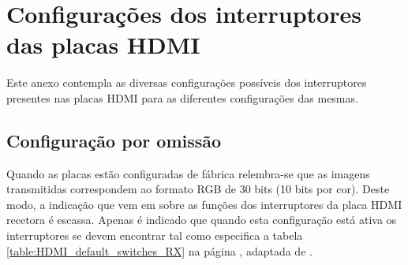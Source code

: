 {\tiny \chapter{Configurações dos interruptores das placas HDMI} \label{ap4:switches}}

Este anexo contempla as diversas configurações possíveis dos interruptores presentes nas placas HDMI para as diferentes configurações das mesmas.

\section{Configuração por omissão} \label{sec:HDMIconfigdefault_switches}

Quando as placas estão configuradas de fábrica relembra-se que as imagens transmitidas correspondem ao formato RGB de 30 bits (10 bits por cor). Deste modo, a indicação que vem em \cite{R009} sobre as funções dos interruptores da placa HDMI recetora é escassa. Apenas é indicado que quando esta configuração está ativa os interruptores se devem encontrar tal como especifica a tabela \ref{table:HDMI_default_switches_RX} na página \pageref{table:HDMI_default_switches_RX}, adaptada de \cite{R009}.



